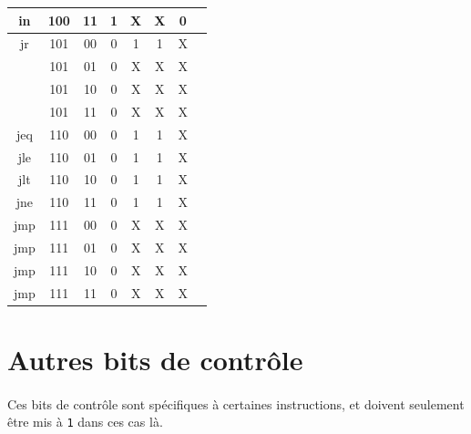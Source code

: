 \documentclass[11pt, a4paper, twoside, titlepage]{article}
\begin{document}
\begin{center}
\begin{tabular}{|c|c|c|c|c|c|c|c|}
		in		& 100 & 11 & 1 & X & X & 0 \\
		\hline
		jr		& 101 & 00 & 0 & 1 & 1 & X \\
				& 101 & 01 & 0 & X & X & X \\
				& 101 & 10 & 0 & X & X & X \\
				& 101 & 11 & 0 & X & X & X \\
		\hline
		jeq		& 110 & 00 & 0 & 1 & 1 & X \\
		jle		& 110 & 01 & 0 & 1 & 1 & X \\
		jlt		& 110 & 10 & 0 & 1 & 1 & X \\
		jne		& 110 & 11 & 0 & 1 & 1 & X \\
		\hline
		jmp		& 111 & 00 & 0 & X & X & X \\
		jmp		& 111 & 01 & 0 & X & X & X \\
		jmp		& 111 & 10 & 0 & X & X & X \\
		jmp		& 111 & 11 & 0 & X & X & X \\
		\hline
	\end{tabular}
\end{center}

\newpage
\section{Autres bits de contrôle}
\paragraph{}
Ces bits de contrôle sont spécifiques à certaines instructions, et doivent seulement être mis à \texttt{1} dans ces cas là.
\end{document}

